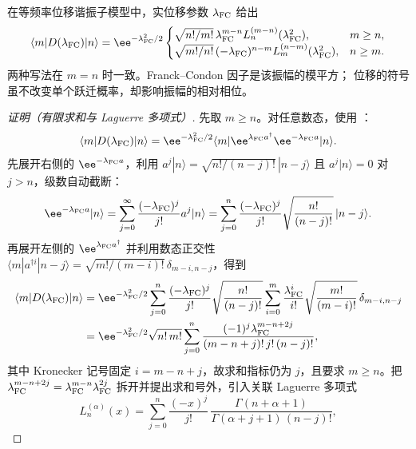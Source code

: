 \begin{proposition}[任意振动态之间的位移重叠]
在等频率位移谐振子模型中，实位移参数 $\lambda_{\rm FC}$ 给出
\[
\langle m|D(\lambda_{\rm FC})|n\rangle
=\ee^{-\lambda_{\rm FC}^2/2}
\begin{cases}
\sqrt{n!/m!}\,\lambda_{\rm FC}^{m-n}
L_n^{(m-n)}(\lambda_{\rm FC}^2),&m\ge n,\\
\sqrt{m!/n!}\,(-\lambda_{\rm FC})^{n-m}
L_m^{(n-m)}(\lambda_{\rm FC}^2),&n\ge m.
\end{cases}
\]
两种写法在 $m=n$ 时一致。Franck--Condon 因子是该振幅的模平方；
位移的符号虽不改变单个跃迁概率，却影响振幅的相对相位。
\end{proposition}
\begin{proof}[证明（有限求和与 Laguerre 多项式）]
先取 $m\ge n$。对任意数态，使用 ：
\begin{equation*}
\langle m|D(\lambda_{\rm FC})|n\rangle
=\ee^{-\lambda_{\rm FC}^2/2}
\langle m|\ee^{\lambda_{\rm FC} a^\dagger}\ee^{-\lambda_{\rm FC} a}|n\rangle.
\end{equation*}
先展开右侧的 \(\ee^{-\lambda_{\rm FC} a}\)，利用 \(a^j|n\rangle=\sqrt{n!/(n-j)!}\,|n-j\rangle\) 且 \(a^j|n\rangle=0\) 对 \(j>n\)，级数自动截断：
\begin{equation*}
\ee^{-\lambda_{\rm FC} a}|n\rangle
=\sum_{j=0}^{\infty}\frac{(-\lambda_{\rm FC})^j}{j!}a^j|n\rangle
=\sum_{j=0}^{n}\frac{(-\lambda_{\rm FC})^j}{j!}
\sqrt{\frac{n!}{(n-j)!}}\,|n-j\rangle.
\end{equation*}
再展开左侧的 \(\ee^{\lambda_{\rm FC} a^\dagger}\) 并利用数态正交性 \(\langle m|a^{\dagger i}|n-j\rangle=\sqrt{m!/(m-i)!}\,\delta_{m-i,n-j}\)，得到
\begin{align*}
\langle m|D(\lambda_{\rm FC})|n\rangle
&=\ee^{-\lambda_{\rm FC}^2/2}
\sum_{j=0}^{n}\frac{(-\lambda_{\rm FC})^j}{j!}
\sqrt{\frac{n!}{(n-j)!}}
\sum_{i=0}^{m}\frac{\lambda_{\rm FC}^i}{i!}
\sqrt{\frac{m!}{(m-i)!}}\,\delta_{m-i,n-j}\\
&=\ee^{-\lambda_{\rm FC}^2/2}\sqrt{n!\,m!}
\sum_{j=0}^{n}\frac{(-1)^j\lambda_{\rm FC}^{m-n+2j}}{(m-n+j)!\,j!\,(n-j)!},
\end{align*}
其中 Kronecker 记号固定 \(i=m-n+j\)，故求和指标仍为 \(j\)，且要求 \(m\ge n\)。把 \(\lambda_{\rm FC}^{m-n+2j}=\lambda_{\rm FC}^{m-n}\lambda_{\rm FC}^{2j}\) 拆开并提出求和号外，引入关联 Laguerre 多项式
\begin{equation*}
L_n^{(\alpha)}(x)
=\sum_{j=0}^{n}\frac{(-x)^j}{j!}\,
\frac{\Gamma(n+\alpha+1)}{\Gamma(\alpha+j+1)\,(n-j)!},
\end{equation*}

\end{proof}
